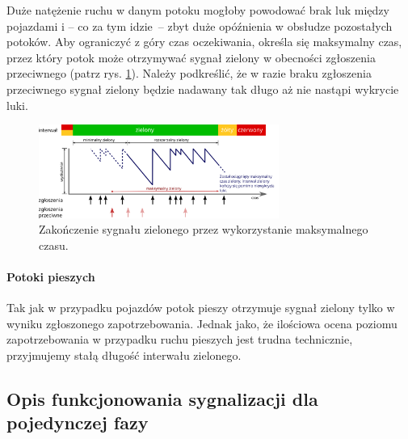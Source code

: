 \documentclass{pracamgr}
\begin{document}
Duże natężenie ruchu w danym potoku mogłoby powodować brak luk między
pojazdami i -- co za tym idzie~-- zbyt duże opóźnienia w obsłudze
pozostałych potoków. Aby ograniczyć z góry czas oczekiwania, określa
się maksymalny czas, przez który potok może otrzymywać sygnał zielony
w obecności zgłoszenia przeciwnego (patrz
rys. \ref{img:max-out}). Należy podkreślić, że w razie braku
zgłoszenia przeciwnego sygnał zielony będzie nadawany tak długo aż nie
nastąpi wykrycie luki.
\begin{figure}[ht]
  \centering
  \includegraphics[width=0.7\textwidth]{img/signals-max-out}
  \caption{Zakończenie sygnału zielonego przez wykorzystanie
    maksymalnego czasu.}
\label{img:max-out}
\end{figure}

\paragraph{Potoki pieszych} Tak jak w przypadku pojazdów potok pieszy
otrzymuje sygnał zielony tylko w wyniku zgłoszonego
zapotrzebowania. Jednak jako, że ilościowa ocena poziomu
zapotrzebowania w przypadku ruchu pieszych jest trudna technicznie,
przyjmujemy stałą długość interwału zielonego.

\subsection{Opis funkcjonowania sygnalizacji dla pojedynczej fazy}
\end{document}
